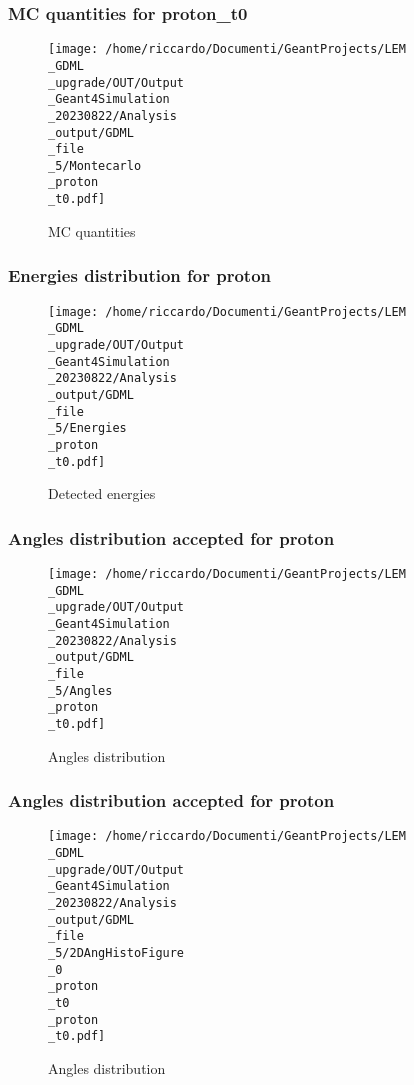 \documentclass[8pt]{beamer}
\begin{document}
            \begin{frame}
                \frametitle{MC quantities for proton\_t0}
            
        \begin{figure}[h]
            \centering
            \texttt{[image: /home/riccardo/Documenti/GeantProjects/LEM\\\_GDML\\\_upgrade/OUT/Output\\\_Geant4Simulation\\\_20230822/Analysis\\\_output/GDML\\\_file\\\_5/Montecarlo\\\_proton\\\_t0.pdf]}
            \caption{MC quantities}
        \end{figure}
        
            \end{frame}
            
            \begin{frame}
                \frametitle{Energies distribution for proton}
            
        \begin{figure}[h]
            \centering
            \texttt{[image: /home/riccardo/Documenti/GeantProjects/LEM\\\_GDML\\\_upgrade/OUT/Output\\\_Geant4Simulation\\\_20230822/Analysis\\\_output/GDML\\\_file\\\_5/Energies\\\_proton\\\_t0.pdf]}
            \caption{Detected energies}
        \end{figure}
        
            \end{frame}
            
            \begin{frame}
                \frametitle{Angles distribution accepted for proton}
            
        \begin{figure}[h]
            \centering
            \texttt{[image: /home/riccardo/Documenti/GeantProjects/LEM\\\_GDML\\\_upgrade/OUT/Output\\\_Geant4Simulation\\\_20230822/Analysis\\\_output/GDML\\\_file\\\_5/Angles\\\_proton\\\_t0.pdf]}
            \caption{Angles distribution}
        \end{figure}
        
            \end{frame}
            
            \begin{frame}
                \frametitle{Angles distribution accepted for proton}
            
        \begin{figure}[h]
            \centering
            \texttt{[image: /home/riccardo/Documenti/GeantProjects/LEM\\\_GDML\\\_upgrade/OUT/Output\\\_Geant4Simulation\\\_20230822/Analysis\\\_output/GDML\\\_file\\\_5/2DAngHistoFigure\\\_0\\\_proton\\\_t0\\\_proton\\\_t0.pdf]}
            \caption{Angles distribution}
        \end{figure}
        
            \end{frame}
            
\end{document}

